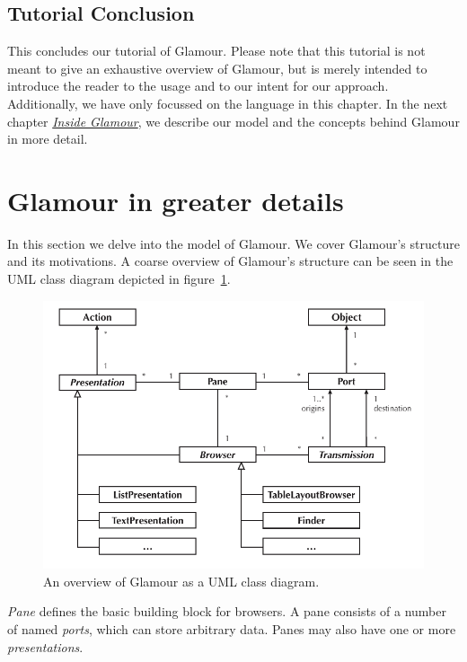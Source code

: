 \documentclass[a4paper,10pt,twoside]{book}
\begin{document}
\subsection{Tutorial Conclusion}

This concludes our tutorial of Glamour. Please note that this tutorial is not meant to give an exhaustive overview of Glamour, but is merely intended to introduce the reader to the usage and to our intent for our approach. Additionally, we have only focussed on the language in this chapter. In the next chapter \hyperref[chp:design]{\emph{Inside Glamour}}, we describe our model and the concepts behind Glamour in more detail.



\section{Glamour in greater details}

In this section we delve into the model of Glamour. We cover Glamour's
structure and its motivations. A coarse overview of Glamour's
structure can be seen in the UML class diagram depicted in
figure~\ref{fig:uml-overview}.

\begin{figure}[htbp]
\centerline{\includegraphics[width=\linewidth]{class_diagram.pdf}}
\caption{An overview of Glamour as a UML class diagram.}
\label{fig:uml-overview}
\end{figure}

\emph{Pane} defines the basic building block for browsers. A pane
consists of a number of named \emph{ports}, which can store arbitrary
data. Panes may also have one or more \emph{presentations}.
\end{document}
